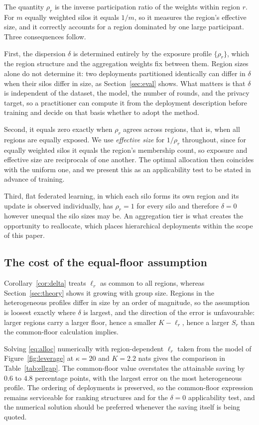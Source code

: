 \documentclass[acmsmall,screen,review,anonymous]{acmart}
\theoremstyle{acmdefinition}%
\begin{document}
The quantity $\rho_r$ is the inverse participation ratio of the weights within
region $r$. For $m$ equally weighted silos it equals $1/m$, so it measures the
region's effective size, and it correctly accounts for a region dominated by one
large participant. Three consequences follow.

First, the dispersion $\delta$ is determined entirely by the exposure profile
$\{\rho_r\}$, which the region structure and the aggregation weights fix between
them. Region sizes alone do not determine it: two deployments partitioned
identically can differ in $\delta$ when their silos differ in size, as
Section~\ref{sec:eval} shows. What matters is that $\delta$ is independent of the
dataset, the model, the number of rounds, and the privacy target, so a
practitioner can compute it from the deployment description before training and
decide on that basis whether to adopt the method.

Second, it equals zero exactly when $\rho_r$ agrees across regions, that is, when
all regions are equally exposed. We use \emph{effective size} for $1/\rho_r$
throughout, since for equally weighted silos it equals the region's membership
count, so exposure and effective size are reciprocals of one another. The optimal
allocation then coincides with the uniform one, and we present this as an
applicability test to be stated in advance of training.

Third, flat federated learning, in which each silo forms its own region and its
update is observed individually, has $\rho_r = 1$ for every silo and therefore
$\delta = 0$ however unequal the silo sizes may be. An aggregation tier is what
creates the opportunity to reallocate, which places hierarchical deployments
within the scope of this paper.

\subsection{The cost of the equal-floor assumption}

Corollary~\ref{cor:delta} treats $\ell_r$ as common to all regions, whereas
Section~\ref{sec:theory} shows it growing with group size. Regions in the
heterogeneous profiles differ in size by an order of magnitude, so the assumption
is loosest exactly where $\delta$ is largest, and the direction of the error is
unfavourable: larger regions carry a larger floor, hence a smaller $K - \ell_r$,
hence a larger $S_r$ than the common-floor calculation implies.

Solving \eqref{eq:alloc} numerically with region-dependent $\ell_r$ taken from the
model of Figure~\ref{fig:leverage} at $\kappa = 20$ and $K = 2.2$ nats gives the
comparison in Table~\ref{tab:ellgap}. The common-floor value overstates the
attainable saving by $0.6$ to $4.8$ percentage points, with the largest error on
the most heterogeneous profile. The ordering of deployments is preserved, so the
common-floor expression remains serviceable for ranking structures and for the
$\delta = 0$ applicability test, and the numerical solution should be preferred
whenever the saving itself is being quoted.
\end{document}
